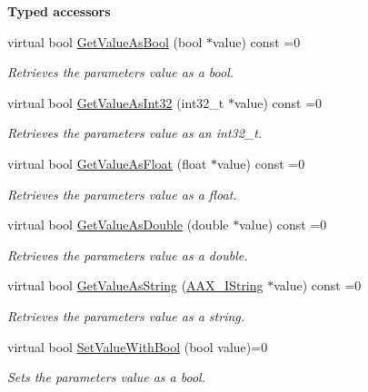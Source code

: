 \begin{Indent}{\bf Typed accessors}\par
\begin{DoxyCompactItemize}
\item 
virtual bool \hyperlink{a00108_a9d86d7e89489e7f7ccbacaa55eb98f72}{Get\+Value\+As\+Bool} (bool $\ast$value) const =0
\begin{DoxyCompactList}\small\item\em Retrieves the parameter\textquotesingle{}s value as a bool. \end{DoxyCompactList}\item 
virtual bool \hyperlink{a00108_a2a7d538cbb30de98c5d55acdddbec05f}{Get\+Value\+As\+Int32} (int32\+\_\+t $\ast$value) const =0
\begin{DoxyCompactList}\small\item\em Retrieves the parameter\textquotesingle{}s value as an int32\+\_\+t. \end{DoxyCompactList}\item 
virtual bool \hyperlink{a00108_a8054cde098e28f91f9d3abf6341cf523}{Get\+Value\+As\+Float} (float $\ast$value) const =0
\begin{DoxyCompactList}\small\item\em Retrieves the parameter\textquotesingle{}s value as a float. \end{DoxyCompactList}\item 
virtual bool \hyperlink{a00108_ad9ab3c9e0ee521e445f44b77ae5d9d06}{Get\+Value\+As\+Double} (double $\ast$value) const =0
\begin{DoxyCompactList}\small\item\em Retrieves the parameter\textquotesingle{}s value as a double. \end{DoxyCompactList}\item 
virtual bool \hyperlink{a00108_ab0d640c37120decbbe48f0c1483770f9}{Get\+Value\+As\+String} (\hyperlink{a00113}{A\+A\+X\+\_\+\+I\+String} $\ast$value) const =0
\begin{DoxyCompactList}\small\item\em Retrieves the parameter\textquotesingle{}s value as a string. \end{DoxyCompactList}\item 
virtual bool \hyperlink{a00108_ae925146da822a568029ff295006152e2}{Set\+Value\+With\+Bool} (bool value)=0
\begin{DoxyCompactList}\small\item\em Sets the parameter\textquotesingle{}s value as a bool. \end{DoxyCompactList}\item 

\end{DoxyCompactItemize}
\end{Indent}
